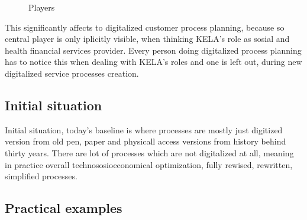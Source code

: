 \begin{figure}
 \begin{center}
  \caption{Players}
  \label{fig:players} 
 \end{center}
\end{figure}

This significantly affects to digitalized customer process planning,
because so central player is only iplicitly visible,
when thinking KE\-LA's role as sosial and health financial services provider.
Every person doing digitalized process planning has to notice this
when dealing with KE\-LA's roles and one is left out,
during new digitalized service processes creation.

\subsection{Initial situation}
\label{initial_situation}

Initial situation,
today's baseline is where processes are mostly just digitized version from old pen,
paper and physicall access versions from history behind thirty years.
There are lot of processes which are not digitalized at all,
meaning in practice overall technososioeconomical optimization,
fully rewised, rewritten, simplified processes.

\subsection{Practical examples}
\label{practical_examples}


